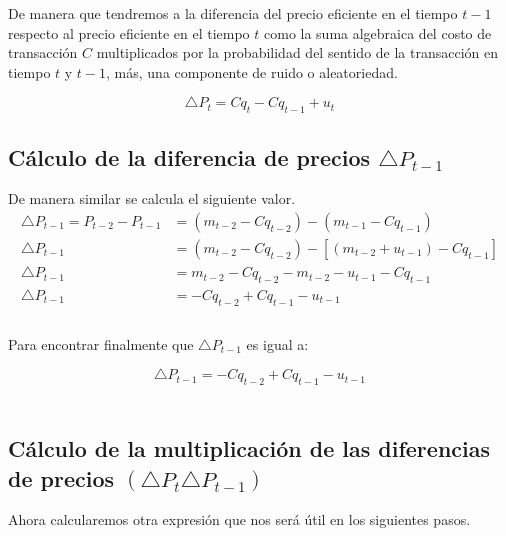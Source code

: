 \documentclass[a4paper]{article}
\begin{document}
De manera que tendremos a la diferencia del precio eficiente en el tiempo $t-1$ respecto al precio eficiente en el tiempo $t$ como la suma algebraica del costo de transacci\'on $C$ multiplicados por la probabilidad del sentido de la transacci\'on en tiempo $t$ y $t-1$, m\'as, una componente de ruido o aleatoriedad.

\begin{equation}
\triangle{P}_{t} = C{q}_{t} - C{q}_{t-1} + {u}_{t}
\end{equation}

\newpage

\subsection*{C\'alculo de la diferencia de precios $\triangle{P}_{t-1}$ }

De manera similar se calcula el siguiente valor. \\ 

\begin{equation*}
\begin{aligned}
	\triangle{P}_{t-1} = {P}_{t-2} - {P}_{t-1} &= ({m}_{t-2} - C {q}_{t-2}) - ({m}_{t-1} - C {q}_{t-1}) \\
	 \triangle{P}_{t-1} &= ({m}_{t-2} - C{q}_{t-2}) - \left[ ({m}_{t-2} + {u}_{t-1}) - C{q}_{t-1}\right] \\
     \triangle{P}_{t-1} &= {m}_{t-2} - C{q}_{t-2} - {m}_{t-2} - {u}_{t-1} - C{q}_{t-1} \\
     \triangle{P}_{t-1} &= - C{q}_{t-2} + C{q}_{t-1} - {u}_{t-1} \\ \\     
\end{aligned}
\end{equation*}

Para encontrar finalmente que $\triangle{P}_{t-1}$ es igual a:

\begin{equation}
\triangle{P}_{t-1} =  - C{q}_{t-2} + C{q}_{t-1} - {u}_{t-1}
\end{equation}
\\

\subsection*{C\'alculo de la multiplicaci\'on de las diferencias de precios $(\triangle{P}_{t}\triangle{P}_{t-1})$}

Ahora calcularemos otra expresi\'on que nos ser\'a \'util en los siguientes pasos. \\
\end{document}
